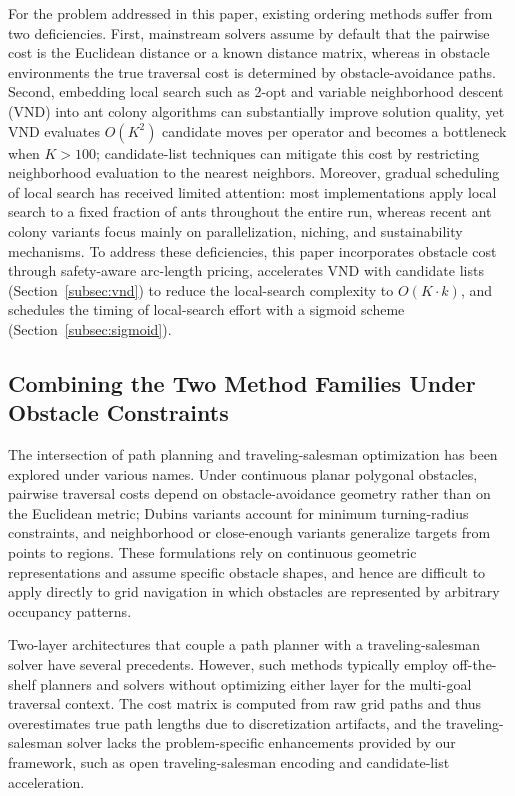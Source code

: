 \documentclass[pdflatex,sn-basic,Numbered]{sn-jnl}
\begin{document}
For the problem addressed in this paper, existing ordering methods suffer from two deficiencies. First, mainstream solvers assume by default that the pairwise cost is the Euclidean distance or a known distance matrix, whereas in obstacle environments the true traversal cost is determined by obstacle-avoidance paths. Second, embedding local search such as 2-opt and variable neighborhood descent (VND) into ant colony algorithms can substantially improve solution quality\cite{ref24,ref25,ref43}, yet VND evaluates $O(K^2)$ candidate moves per operator and becomes a bottleneck when $K > 100$; candidate-list techniques can mitigate this cost by restricting neighborhood evaluation to the nearest neighbors\cite{ref26}. Moreover, gradual scheduling of local search has received limited attention: most implementations apply local search to a fixed fraction of ants throughout the entire run, whereas recent ant colony variants focus mainly on parallelization, niching, and sustainability mechanisms\cite{ref27,ref28,ref29,ref30}. To address these deficiencies, this paper incorporates obstacle cost through safety-aware arc-length pricing, accelerates VND with candidate lists (Section~\ref{subsec:vnd}) to reduce the local-search complexity to $O(K \cdot k)$, and schedules the timing of local-search effort with a sigmoid scheme (Section~\ref{subsec:sigmoid}).

\subsection{Combining the Two Method Families Under Obstacle Constraints}

The intersection of path planning and traveling-salesman optimization has been explored under various names\cite{ref4,ref36}. Under continuous planar polygonal obstacles, pairwise traversal costs depend on obstacle-avoidance geometry rather than on the Euclidean metric\cite{ref39}; Dubins variants account for minimum turning-radius constraints, and neighborhood or close-enough variants generalize targets from points to regions\cite{ref40}. These formulations rely on continuous geometric representations and assume specific obstacle shapes, and hence are difficult to apply directly to grid navigation in which obstacles are represented by arbitrary occupancy patterns.

Two-layer architectures that couple a path planner with a traveling-salesman solver have several precedents\cite{ref1,ref2}. However, such methods typically employ off-the-shelf planners and solvers without optimizing either layer for the multi-goal traversal context. The cost matrix is computed from raw grid paths and thus overestimates true path lengths due to discretization artifacts, and the traveling-salesman solver lacks the problem-specific enhancements provided by our framework, such as open traveling-salesman encoding and candidate-list acceleration.
\end{document}
